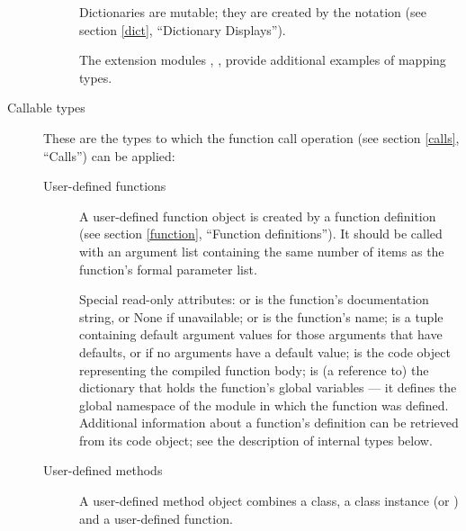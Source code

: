 \begin{description}
\begin{description}
Dictionaries are mutable; they are created by the 
notation (see section \ref{dict}, ``Dictionary Displays'').

The extension modules ,
, 
provide additional examples of mapping types.

\end{description} %

\item[Callable types]
These are the types to which the function call operation (see section
\ref{calls}, ``Calls'') can be applied:

\begin{description}

\item[User-defined functions]
A user-defined function object is created by a function definition
(see section \ref{function}, ``Function definitions'').  It should be
called with an argument
list containing the same number of items as the function's formal
parameter list.

Special read-only attributes:  or  is the
function's documentation string, or None if unavailable;
 or  is the function's name;
 is a tuple containing default argument values for
those arguments that have defaults, or  if no arguments
have a default value;  is the code object representing
the compiled function body;  is (a reference to)
the dictionary that holds the function's global variables --- it
defines the global namespace of the module in which the function was
defined.  Additional information about a function's definition can be
retrieved from its code object; see the description of internal types
below.

\item[User-defined methods]
A user-defined method object combines a class, a class instance (or
) and a user-defined function.


\end{description}
\end{description}
